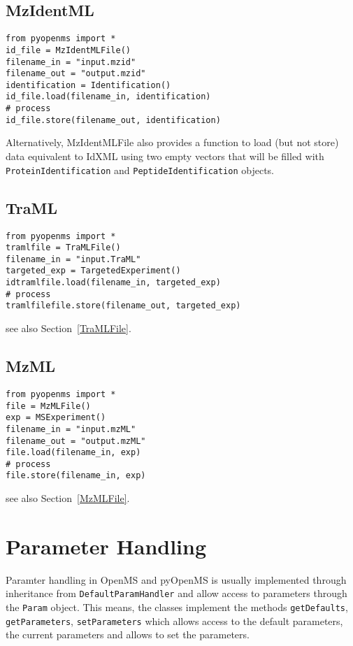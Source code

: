 \documentclass[10pt]{article}
\begin{document}
\subsection{MzIdentML}
\begin{verbatim}
from pyopenms import *
id_file = MzIdentMLFile()
filename_in = "input.mzid"
filename_out = "output.mzid"
identification = Identification()
id_file.load(filename_in, identification)
# process
id_file.store(filename_out, identification)
\end{verbatim}

Alternatively, MzIdentMLFile also provides a function to load (but not store)
data equivalent to IdXML using two empty vectors that will be filled with
\texttt{ProteinIdentification} and \texttt{PeptideIdentification} objects.

\subsection{TraML}
\begin{verbatim}
from pyopenms import *
tramlfile = TraMLFile()
filename_in = "input.TraML"
targeted_exp = TargetedExperiment()
idtramlfile.load(filename_in, targeted_exp)
# process
tramlfilefile.store(filename_out, targeted_exp)
\end{verbatim}

see also Section~\ref{TraMLFile}.

\subsection{MzML}
\begin{verbatim}
from pyopenms import *
file = MzMLFile()
exp = MSExperiment()
filename_in = "input.mzML"
filename_out = "output.mzML"
file.load(filename_in, exp)
# process
file.store(filename_in, exp)
\end{verbatim}

see also Section~\ref{MzMLFile}.

\pagebreak
\section{Parameter Handling}

Paramter handling in OpenMS and pyOpenMS is usually implemented through
inheritance from \texttt{DefaultParamHandler} and allow access to parameters
through the \texttt{Param} object. This means, the classes implement the
methods \texttt{getDefaults}, \texttt{getParameters}, \texttt{setParameters}
which allows access to the default parameters, the current parameters and
allows to set the parameters.
\end{document}

